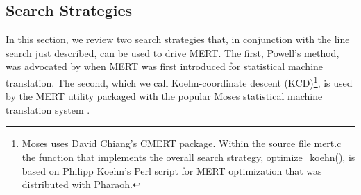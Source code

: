 \documentclass[11pt,tightenlines,kern-1pt]{article}
\begin{document}
    
\subsection{Search Strategies}

In this section, we review two search strategies that, in conjunction with the line search just described, can be used to drive MERT. The first, Powell's method, was advocated by  when MERT was first introduced for statistical machine translation. The second, which we call Koehn-coordinate descent (KCD)\footnote{Moses uses David Chiang's CMERT package. Within the source file mert.c the function that implements the overall search strategy, optimize\_koehn(), is based on Philipp Koehn's Perl script for MERT optimization that was distributed with Pharaoh. }, is used by the MERT utility packaged with the popular Moses statistical machine translation system \cite{koehn2007}. 
\end{document}
